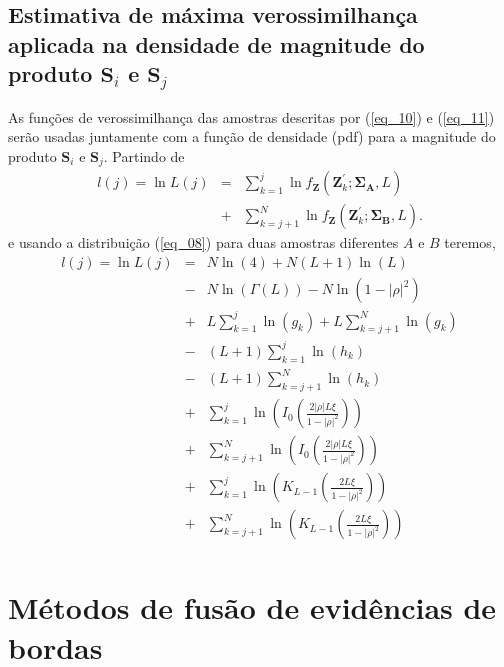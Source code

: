 \documentclass[conference]{IEEEtran}
\begin{document}
\subsection{Estimativa de máxima verossimilhança aplicada na densidade de magnitude do produto $\mathbf{S}_i$ e $\mathbf{S}_j$}
As funções de verossimilhança das amostras descritas por (\ref{eq_10}) e (\ref{eq_11}) serão usadas juntamente com a função de densidade (pdf) para a magnitude do produto $\mathbf{S}_i$ e $\mathbf{S}_j$. Partindo de 
\begin{equation*}
\begin{array}{rcl}
	l(j)=\ln L(j)&=&\sum_{k=1}^{j}\ln f_{\mathbf{Z}}(\mathbf{Z}_{k}^{'};\mathbf{\Sigma_{A}},L)\\
	             &+&\sum_{k=j+1}^{N}\ln f_{\mathbf{Z}}(\mathbf{Z}_{k}^{'};\mathbf{\Sigma_{B}},L).
\end{array}
\end{equation*}
e usando a distribuição (\ref{eq_08}) para duas amostras diferentes $A$ e $B$ teremos,
\begin{equation}
\begin{array}{rcl}
	l(j)=\ln L(j)&=&N\ln(4)+N(L+1)\ln(L)\\
	             &-&N\ln(\Gamma(L))-N\ln(1-|\rho|^2)\\
	             &+&L\sum_{k=1}^{j}\ln(g_k)+L\sum_{k=j+1}^{N}\ln(g_k) \\
	             &-&(L+1)\sum_{k=1}^{j}\ln(h_k)\\
	             &-&(L+1)\sum_{k=j+1}^{N}\ln(h_k) \\
	             &+&\sum_{k=1}^{j}\ln \left(I_0\left(\frac{2|\rho|L\xi}{1-|\rho|^2}\right)\right)\\ 
	             &+&\sum_{k=j+1}^{N} \ln \left(I_0\left(\frac{2|\rho|L\xi}{1-|\rho|^2}\right)\right)        \\
	             &+&\sum_{k=1}^{j}\ln \left(K_{L-1}\left(\frac{2L\xi}{1-|\rho|^2}\right)\right)\\
	             &+&\sum_{k=j+1}^{N}\ln \left( K_{L-1}\left(\frac{2L\xi}{1-|\rho|^2}\right)\right)         \\
	             
\end{array}
\end{equation}


\section{Métodos de fusão de evidências de bordas}
\end{document}
